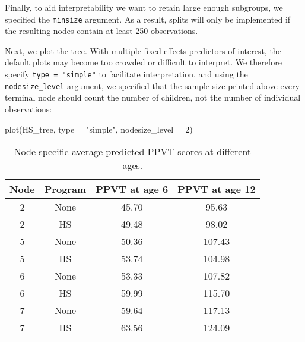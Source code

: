 \documentclass[doc,floatsintext,natbib]{apa7}
\begin{document}

Finally, to aid interpretability we want to retain large enough subgroups, we specified the \texttt{minsize} argument. As a result, splits will only be implemented if the resulting nodes contain at least 250 observations.

Next, we plot the tree. With multiple fixed-effects predictors of interest, the default plots may become too crowded or difficult to interpret. We therefore specify \verb|type = "simple"| to facilitate interpretation, and using the \verb|nodesize_level| argument, we specified that the sample size printed above every terminal node should count the number of children, not the number of individual observations:

\begin{Schunk}
\begin{Sinput}
 plot(HS_tree, type = "simple", nodesize_level = 2)
\end{Sinput}
\end{Schunk}


\begin{table}

\caption{\label{tab:predictions}Node-specific average predicted PPVT scores at different ages.}
\begin{tabular}[t]{cccc}
\toprule
Node & Program & PPVT at age 6 & PPVT at age 12\\
\midrule
2 & None & 45.70 & 95.63\\
2 & HS & 49.48 & 98.02\\
5 & None & 50.36 & 107.43\\
5 & HS & 53.74 & 104.98\\
6 & None & 53.33 & 107.82\\
6 & HS & 59.99 & 115.70\\
7 & None & 59.64 & 117.13\\
7 & HS & 63.56 & 124.09\\
\bottomrule
\end{tabular}
\end{table}
\FloatBarrier
\end{document}
